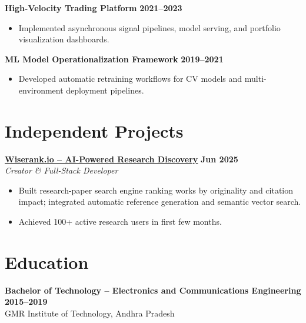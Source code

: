 \documentclass[11pt]{article}
\begin{document}
\textbf{High-Velocity Trading Platform} \hfill \textbf{2021–2023}\\
\begin{itemize}[leftmargin=*,nosep]
\item Implemented asynchronous signal pipelines, model serving, and portfolio visualization dashboards.
\end{itemize}

\textbf{ML Model Operationalization Framework} \hfill \textbf{2019–2021}\\
\begin{itemize}[leftmargin=*,nosep]
\item Developed automatic retraining workflows for CV models and multi-environment deployment pipelines.
\end{itemize}

\section{Independent Projects}
\textbf{\href{https://wiserank.io}{Wiserank.io – AI-Powered Research Discovery}} \hfill \textbf{Jun 2025}\\
\textit{Creator \& Full-Stack Developer}
\begin{itemize}[leftmargin=*,nosep]
\item Built research-paper search engine ranking works by originality and citation impact; integrated automatic reference generation and semantic vector search.
\item Achieved 100+ active research users in first few months.
\end{itemize}

\section{Education}
\textbf{Bachelor of Technology – Electronics and Communications Engineering} \hfill \textbf{2015–2019}\\
GMR Institute of Technology, Andhra Pradesh
\end{document}
